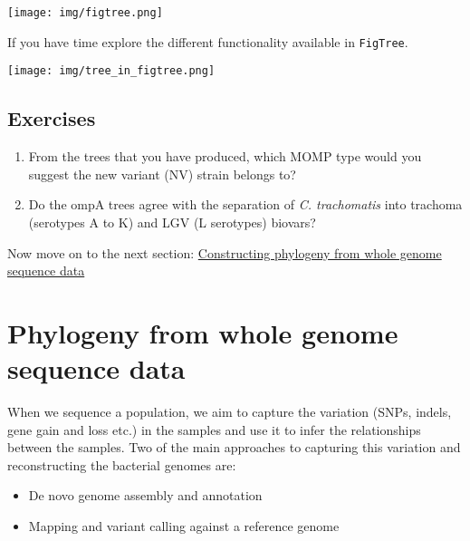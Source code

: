 \documentclass[11pt]{article}
\providecommand{\tightlist}{%
      \setlength{\itemsep}{0pt}\setlength{\parskip}{0pt}}
\begin{document}
\begin{center}
\texttt{[image: img/figtree.png]}
\end{center}


If you have time explore the different functionality available in
\texttt{FigTree}.


\begin{center}
\texttt{[image: img/tree\_in\_figtree.png]}
\end{center}


    \hypertarget{exercises}{%
\subsection{Exercises}\label{exercises}}

\begin{enumerate}
\def\labelenumi{\arabic{enumi}.}
\tightlist
\item
  From the trees that you have produced, which MOMP type would you
  suggest the new variant (NV) strain belongs to?
\item
  Do the ompA trees agree with the separation of \textit{C. trachomatis}
  into trachoma (serotypes A to K) and LGV (L serotypes) biovars?
\end{enumerate}

    Now move on to the next section: \href{snp_phylogeny.ipynb}{Constructing
phylogeny from whole genome sequence data}





\newpage





    \hypertarget{phylogeny-from-whole-genome-sequence-data}{%
\section{Phylogeny from whole genome sequence
data}\label{phylogeny-from-whole-genome-sequence-data}}

    When we sequence a population, we aim to capture the variation (SNPs,
indels, gene gain and loss etc.) in the samples and use it to infer the
relationships between the samples. Two of the main approaches to
capturing this variation and reconstructing the bacterial genomes are:

\begin{itemize}
\tightlist
\item
  De novo genome assembly and annotation
\item
  Mapping and variant calling against a reference genome
\end{itemize}
\end{document}
